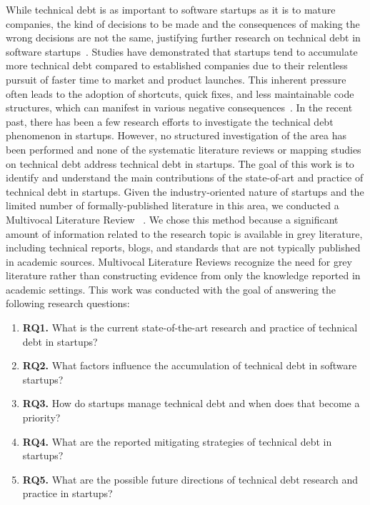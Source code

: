 While technical debt is as important to software startups as it is to mature companies, the kind of decisions to be made and the consequences of making the wrong decisions are not the same, justifying further research on technical debt in software startups~\cite{Unterkalmsteiner16}.
Studies have demonstrated that startups tend to accumulate more technical debt compared to established companies due to their relentless pursuit of faster time to market and product launches.
This inherent pressure often leads to the adoption of shortcuts, quick fixes, and less maintainable code structures, which can manifest in various negative consequences~\cite{Giardino2016,Klotins882019}.
In the recent past, there has been a few research efforts to investigate the technical debt phenomenon in startups.
However, no structured investigation of the area has been performed and none of the systematic literature reviews or mapping studies on technical debt address technical debt in startups.
The goal of this work is to identify and understand the main contributions of the state-of-art and practice of technical debt in startups.
Given the industry-oriented nature of startups and the limited number of formally-published literature in this area, we conducted a Multivocal Literature Review ~\cite{GAROUSI2019101}.
We chose this method because a significant amount of information related to the research topic is available in grey literature, including technical reports, blogs, and standards that are not typically published in academic sources.
Multivocal Literature Reviews recognize the need for grey literature rather than constructing evidence from only the knowledge reported in academic settings.
This work was conducted with the goal of answering the following research questions:
\begin{enumerate}
\item \textbf{RQ1.} What is the current state-of-the-art research and practice of technical debt in startups?
\item \textbf{RQ2.} What factors influence the accumulation of technical debt in software startups?
\item \textbf{RQ3.} How do startups manage technical debt and when does that become a priority?
\item \textbf{RQ4.} What are the reported mitigating strategies of technical debt in startups?
\item \textbf{RQ5.} What are the possible future directions of technical debt research and practice in startups?
\end{enumerate}

